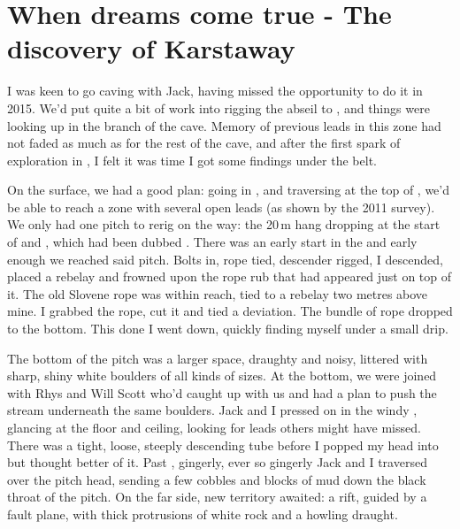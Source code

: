 \section{When dreams come true - The discovery of Karstaway} 


I was keen to go caving with Jack, having missed the opportunity to do it in 2015. We'd put quite a bit of work into rigging the abseil to , and things were looking up in the  branch of the cave. Memory of previous leads in this zone had not faded as much as for the rest of the cave, and after the first spark of exploration in , I felt it was time I got some findings under the belt.

On the surface, we had a good plan: going in , and traversing at the top of , we'd be able to reach a zone with several open leads (as shown by the 2011 survey). We only had one pitch to rerig on the way: the 20\,m hang dropping at the start of  and , which had been dubbed . There was an early start in the  and early enough we reached said pitch. Bolts in, rope tied, descender rigged, I descended, placed a rebelay and frowned upon the rope rub that had appeared just on top of it. The old Slovene rope was within reach, tied to a rebelay two metres above mine. I grabbed the rope, cut it and tied a deviation. The bundle of rope dropped to the bottom. This done I went down, quickly finding myself under a small drip. 

The bottom of the pitch was a larger space, draughty and noisy, littered with sharp, shiny white boulders of all kinds of sizes. At the bottom, we were joined with Rhys and Will Scott who'd caught up with us and had a plan to push the stream underneath the same boulders. Jack and I pressed on in the windy , glancing at the floor and ceiling, looking for leads others might have missed. There was a tight, loose, steeply descending tube before   I popped my head into but thought better of it. Past , gingerly, ever so gingerly Jack and I traversed over the pitch head, sending a few cobbles and blocks of mud down the black throat of the pitch. On the far side, new territory awaited: a rift, guided by a fault plane, with thick protrusions of white rock and a howling draught.

